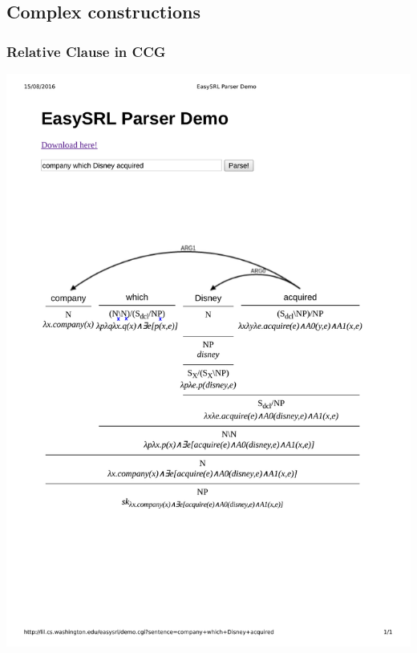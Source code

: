 \documentclass[mathserif,12pt]{beamer}
\begin{document}
\subsection{Complex constructions}
\begin{frame}[noframenumbering]
\frametitle{Relative Clause in CCG}
\centering
\includegraphics[scale=0.7]{figures/ccg-relative-clause}
\end{frame}
\end{document}
